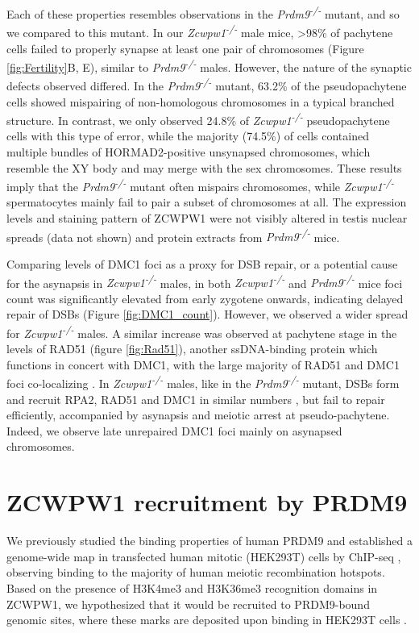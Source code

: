 Each of these properties resembles observations in the \textit{Prdm9\textsuperscript{-/-}} mutant, and so we compared to this mutant.
In our \textit{Zcwpw1\textsuperscript{-/-}} male mice, >98\% of pachytene cells failed to properly synapse at least one pair of chromosomes (Figure \ref{fig:Fertility}B, E), similar to \textit{Prdm9\textsuperscript{-/-}} males.
However, the nature of the synaptic defects observed differed\iffalse supp table 4\fi.
In the \textit{Prdm9\textsuperscript{-/-}} mutant, 63.2\% of the pseudopachytene cells showed mispairing of non-homologous chromosomes in a typical branched structure\iffalse tangled in supp table 4\fi.
In contrast, we only observed 24.8\% of \textit{Zcwpw1\textsuperscript{-/-}} pseudopachytene cells with this type of error, while the majority (74.5\%) of cells contained multiple bundles of HORMAD2-positive unsynapsed chromosomes, which resemble the XY body and may merge with the sex chromosomes\iffalse multibodies in supp table 5 \fi.
These results imply that the \textit{Prdm9\textsuperscript{-/-}} mutant often mispairs chromosomes, while \textit{Zcwpw1\textsuperscript{-/-}} spermatocytes mainly fail to pair a subset of chromosomes at all.
The expression levels and staining pattern of ZCWPW1 were not visibly altered in testis nuclear spreads (data not shown) and protein extracts from \textit{Prdm9\textsuperscript{-/-}} mice.

Comparing levels of DMC1 foci as a proxy for DSB repair, or a potential cause for the asynapsis in \textit{Zcwpw1\textsuperscript{-/-}} males, in both \textit{Zcwpw1\textsuperscript{-/-}} and \textit{Prdm9\textsuperscript{-/-}} mice foci count was significantly elevated from early zygotene onwards, indicating delayed repair of DSBs (Figure \ref{fig:DMC1_count}).
However, we observed a wider spread for \textit{Zcwpw1\textsuperscript{-/-}} males.
A similar increase was observed at pachytene stage in the levels of RAD51 (figure \ref{fig:Rad51}), another ssDNA-binding protein which functions in concert with DMC1, with the large majority of RAD51 and DMC1 foci co-localizing \parencite{Brown2015Small, Tarsounas1999RAD51}.
In \textit{Zcwpw1\textsuperscript{-/-}} males, like in the \textit{Prdm9\textsuperscript{-/-}} mutant, DSBs form and recruit RPA2, RAD51 and DMC1 in similar numbers \parencite{Li2019histone}, but fail to repair efficiently, accompanied by asynapsis and meiotic arrest at pseudo-pachytene.
Indeed, we observe late unrepaired DMC1 foci mainly on asynapsed chromosomes\iffalse supp fig 8 \fi.


\section{ZCWPW1 recruitment by PRDM9}
We previously studied the binding properties of human PRDM9 and established a genome-wide map in transfected human mitotic (HEK293T) cells by ChIP-seq \parencite{Altemose2017map}, observing binding to the majority of human meiotic recombination hotspots.
Based on the presence of H3K4me3 and H3K36me3 recognition domains in ZCWPW1, we hypothesized that it would be recruited to PRDM9-bound genomic sites, where these marks are deposited upon binding in HEK293T cells \parencite{Altemose2017map}.


